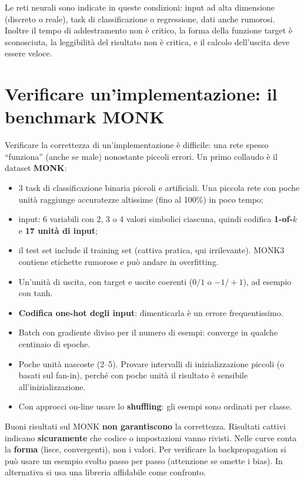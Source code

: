Le reti neurali sono indicate in queste condizioni: input ad alta dimensione (discreto o reale), task di
classificazione o regressione, dati anche rumorosi. Inoltre il tempo di addestramento non è critico, la forma della
funzione target è sconosciuta, la leggibilità del risultato non è critica, e il calcolo dell'uscita deve essere
veloce.

\section{Verificare un'implementazione: il benchmark MONK}

Verificare la correttezza di un'implementazione è difficile: una rete spesso ``funziona'' (anche se male)
nonostante piccoli errori. Un primo collaudo è il dataset \textbf{MONK}:
\begin{itemize}
  \item 3 task di classificazione binaria piccoli e artificiali. Una piccola rete con poche unità raggiunge
        accuratezze altissime (fino al 100\%) in poco tempo;
  \item input: 6 variabili con 2, 3 o 4 valori simbolici ciascuna, quindi codifica \textbf{1-of-$k$} e
        \textbf{17 unità di input};
  \item il test set include il training set (cattiva pratica, qui irrilevante). MONK3 contiene etichette
        rumorose e può andare in overfitting.
\end{itemize}

\begin{idea}
\begin{itemize}
  \item Un'unità di uscita, con target e uscite coerenti ($0/1$ o $-1/+1$), ad esempio con tanh.
  \item \textbf{Codifica one-hot degli input}: dimenticarla è un errore frequentissimo.
  \item Batch con gradiente diviso per il numero di esempi: converge in qualche centinaio di epoche.
  \item Poche unità nascoste (2--5). Provare intervalli di inizializzazione piccoli (o basati sul fan-in), perché
        con poche unità il risultato è sensibile all'inizializzazione.
  \item Con approcci on-line usare lo \textbf{shuffling}: gli esempi sono ordinati per classe.
\end{itemize}
Buoni risultati sul MONK \textbf{non garantiscono} la correttezza. Risultati cattivi indicano \textbf{sicuramente}
che codice o impostazioni vanno rivisti. Nelle curve conta la \textbf{forma} (lisce, convergenti), non i valori.
Per verificare la backpropagation si può usare un esempio svolto passo per passo (attenzione se omette i bias). In
alternativa si usa una libreria affidabile come confronto.
\end{idea}

